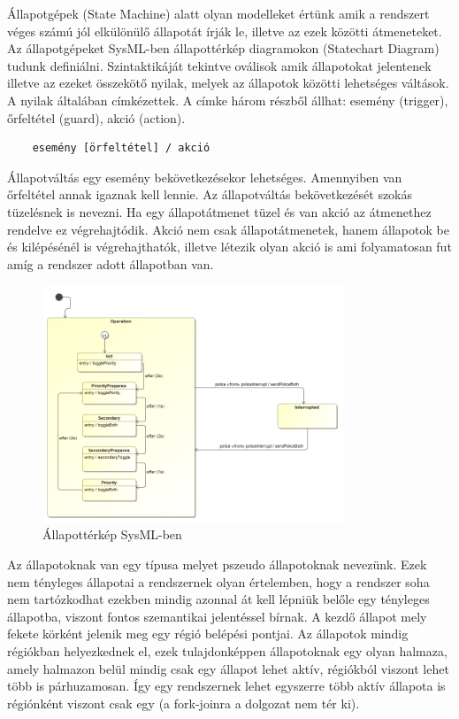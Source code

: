 Állapotgépek (State Machine) alatt olyan modelleket értünk amik a rendszert véges számú jól elkülönülő állapotát írják le, illetve az ezek közötti átmeneteket. Az állapotgépeket SysML-ben állapottérkép diagramokon (Statechart Diagram) tudunk definiálni. Szintaktikáját tekintve oválisok amik állapotokat jelentenek illetve az ezeket összekötő nyilak, melyek az állapotok közötti lehetséges váltások. A nyilak általában címkézettek. A címke három részből állhat: esemény (trigger), őrfeltétel (guard), akció (action).

\lstset{framesep=10pt}
\begin{lstlisting}
	esemény [örfeltétel] / akció
\end{lstlisting}
Állapotváltás egy esemény bekövetkezésekor lehetséges. Amennyiben van őrfeltétel annak igaznak kell lennie. Az állapotváltás bekövetkezését szokás tüzelésnek is nevezni. Ha egy állapotátmenet tüzel és van akció az átmenethez rendelve ez végrehajtódik.
Akció nem csak állapotátmenetek, hanem állapotok be és kilépésénél is végrehajthatók, illetve létezik olyan akció is ami folyamatosan fut amíg a rendszer adott állapotban van.

\begin{figure}[!ht]
	\centering
	\includegraphics[width=90mm, keepaspectratio]{figures/preliminaries/statechart.png}
	\caption{Állapottérkép SysML-ben}
	\label{fig:statechart}
\end{figure}

Az állapotoknak van egy típusa melyet pszeudo állapotoknak nevezünk. Ezek nem tényleges állapotai a rendszernek olyan értelemben, hogy a rendszer soha nem tartózkodhat ezekben mindig azonnal át kell lépniük belőle egy tényleges állapotba, viszont fontos szemantikai jelentéssel bírnak. A kezdő állapot mely fekete körként jelenik meg egy régió belépési pontjai. Az állapotok mindig régiókban helyezkednek el, ezek tulajdonképpen állapotoknak egy olyan halmaza, amely halmazon belül mindig csak egy állapot lehet aktív, régiókból viszont lehet több is párhuzamosan. Így egy rendszernek lehet egyszerre több aktív állapota is régiónként viszont csak egy (a fork-joinra a dolgozat nem tér ki).

